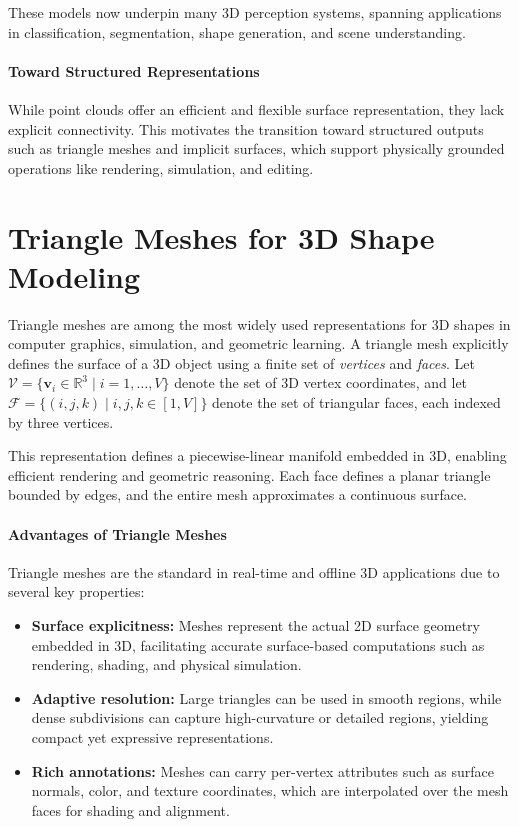 These models now underpin many 3D perception systems, spanning applications in classification, segmentation, shape generation, and scene understanding.

\paragraph{Toward Structured Representations}
While point clouds offer an efficient and flexible surface representation, they lack explicit connectivity. This motivates the transition toward structured outputs such as triangle meshes and implicit surfaces, which support physically grounded operations like rendering, simulation, and editing.  

\newpage

\section{Triangle Meshes for 3D Shape Modeling}
\label{sec:chapter23_triangle_meshes}

Triangle meshes are among the most widely used representations for 3D shapes in computer graphics, simulation, and geometric learning. A triangle mesh explicitly defines the surface of a 3D object using a finite set of \emph{vertices} and \emph{faces}. Let $\mathcal{V} = \{ \mathbf{v}_i \in \mathbb{R}^3 \mid i = 1, \ldots, V \}$ denote the set of 3D vertex coordinates, and let $\mathcal{F} = \{ (i, j, k) \mid i, j, k \in [1, V] \}$ denote the set of triangular faces, each indexed by three vertices.

This representation defines a piecewise-linear manifold embedded in 3D, enabling efficient rendering and geometric reasoning. Each face defines a planar triangle bounded by edges, and the entire mesh approximates a continuous surface.

\paragraph{Advantages of Triangle Meshes} 
Triangle meshes are the standard in real-time and offline 3D applications due to several key properties:
\begin{itemize}
    \item \textbf{Surface explicitness:} Meshes represent the actual 2D surface geometry embedded in 3D, facilitating accurate surface-based computations such as rendering, shading, and physical simulation.
    \item \textbf{Adaptive resolution:} Large triangles can be used in smooth regions, while dense subdivisions can capture high-curvature or detailed regions, yielding compact yet expressive representations.
    \item \textbf{Rich annotations:} Meshes can carry per-vertex attributes such as surface normals, color, and texture coordinates, which are interpolated over the mesh faces for shading and alignment.
\end{itemize}


